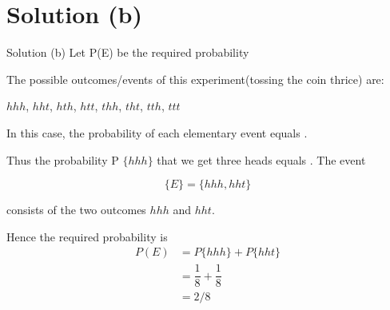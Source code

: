 \documentclass{beamer}
\begin{document}
\section{Solution (b)}
\begin{frame}{Solution (b)}
    Let P(E) be the required probability
    
	The possible outcomes/events of this experiment(tossing the coin thrice) are:
	\begin{center}
	    $hhh$, $hht$, $hth$, $htt$, $thh$, $tht$, $tth$, $ttt$
	\end{center}
	
	
	In this case, the probability of each elementary event equals .
	
	Thus the probability P $\{hhh\}$ that we get three heads equals . The event
	
	\begin{equation}
	   \{E\} = \{hhh, hht\}
	\end{equation}
	
	consists of the two outcomes $hhh$ and $hht$.
	
	Hence the required probability is
	\begin{align}
	    P(E) &=  P \{hhh\} + P \{hht\}\\
	        &= \dfrac{1}{8}+\dfrac{1}{8}\\
	        &=2/8
	\end{align}
\end{frame}	
	
	
\end{document}
